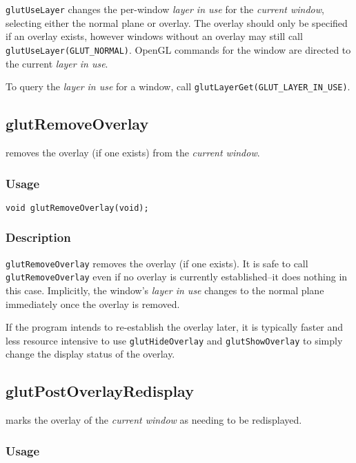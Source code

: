 {\tt glutUseLayer} changes the per-window {\em layer in use} for the
{\em current window}, selecting either the normal plane or overlay.
The overlay should only be specified if an overlay exists, however
windows without an overlay may still call {\tt
glutUseLayer(GLUT\_NORMAL)}.  OpenGL commands for the window are
directed to the current {\em layer in use}.

To query the {\em layer in use} for a window, call {\tt glutLayerGet(GLUT\_LAYER\_IN\_USE)}.

\subsection{glutRemoveOverlay}

 removes the overlay (if one exists) from
the {\em current window}.

\subsubsection*{Usage}

\begin{verbatim}
void glutRemoveOverlay(void);
\end{verbatim}

\subsubsection*{Description}

{\tt glutRemoveOverlay} removes the overlay (if one exists).  It is
safe to call {\tt glutRemoveOverlay} even if no overlay is currently
established--it does nothing in this case.  Implicitly, the window's
{\em layer in use} changes to the normal plane immediately once the
overlay is removed.

If the program intends to re-establish the overlay later, it is
typically faster and less resource intensive to use {\tt glutHideOverlay}
and {\tt glutShowOverlay} to simply change the display status of the
overlay.

\subsection{glutPostOverlayRedisplay}

 marks the overlay of the {\em current
window} as needing to be redisplayed.

\subsubsection*{Usage}

